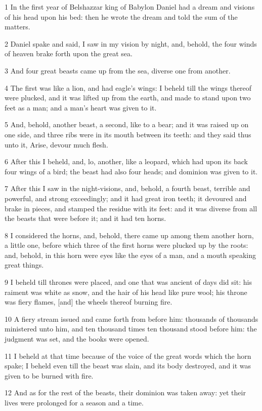 \par 1 In the first year of Belshazzar king of Babylon Daniel had a dream and visions of his head upon his bed: then he wrote the dream and told the sum of the matters.
\par 2 Daniel spake and said, I saw in my vision by night, and, behold, the four winds of heaven brake forth upon the great sea.
\par 3 And four great beasts came up from the sea, diverse one from another.
\par 4 The first was like a lion, and had eagle's wings: I beheld till the wings thereof were plucked, and it was lifted up from the earth, and made to stand upon two feet as a man; and a man's heart was given to it.
\par 5 And, behold, another beast, a second, like to a bear; and it was raised up on one side, and three ribs were in its mouth between its teeth: and they said thus unto it, Arise, devour much flesh.
\par 6 After this I beheld, and, lo, another, like a leopard, which had upon its back four wings of a bird; the beast had also four heads; and dominion was given to it.
\par 7 After this I saw in the night-visions, and, behold, a fourth beast, terrible and powerful, and strong exceedingly; and it had great iron teeth; it devoured and brake in pieces, and stamped the residue with its feet: and it was diverse from all the beasts that were before it; and it had ten horns.
\par 8 I considered the horns, and, behold, there came up among them another horn, a little one, before which three of the first horns were plucked up by the roots: and, behold, in this horn were eyes like the eyes of a man, and a mouth speaking great things.
\par 9 I beheld till thrones were placed, and one that was ancient of days did sit: his raiment was white as snow, and the hair of his head like pure wool; his throne was fiery flames, [and] the wheels thereof burning fire.
\par 10 A fiery stream issued and came forth from before him: thousands of thousands ministered unto him, and ten thousand times ten thousand stood before him: the judgment was set, and the books were opened.
\par 11 I beheld at that time because of the voice of the great words which the horn spake; I beheld even till the beast was slain, and its body destroyed, and it was given to be burned with fire.
\par 12 And as for the rest of the beasts, their dominion was taken away: yet their lives were prolonged for a season and a time.
